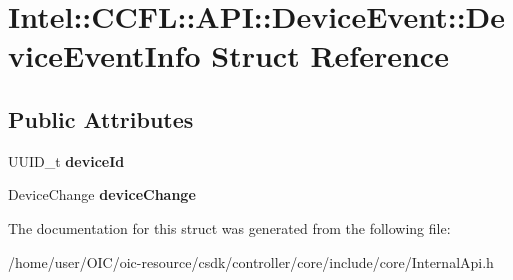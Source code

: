 \hypertarget{structIntel_1_1CCFL_1_1API_1_1DeviceEvent_1_1DeviceEventInfo}{}\section{Intel\+:\+:C\+C\+F\+L\+:\+:A\+P\+I\+:\+:Device\+Event\+:\+:Device\+Event\+Info Struct Reference}
\label{structIntel_1_1CCFL_1_1API_1_1DeviceEvent_1_1DeviceEventInfo}
\subsection*{Public Attributes}
\begin{DoxyCompactItemize}
\item 
\hypertarget{structIntel_1_1CCFL_1_1API_1_1DeviceEvent_1_1DeviceEventInfo_ab80e749741af7265481d4246534c56b8}{}U\+U\+I\+D\+\_\+t {\bfseries device\+Id}\label{structIntel_1_1CCFL_1_1API_1_1DeviceEvent_1_1DeviceEventInfo_ab80e749741af7265481d4246534c56b8}

\item 
\hypertarget{structIntel_1_1CCFL_1_1API_1_1DeviceEvent_1_1DeviceEventInfo_a751d845cbd9e0592bb9187e2f24b9630}{}Device\+Change {\bfseries device\+Change}\label{structIntel_1_1CCFL_1_1API_1_1DeviceEvent_1_1DeviceEventInfo_a751d845cbd9e0592bb9187e2f24b9630}

\end{DoxyCompactItemize}


The documentation for this struct was generated from the following file\+:\begin{DoxyCompactItemize}
\item 
/home/user/\+O\+I\+C/oic-\/resource/csdk/controller/core/include/core/Internal\+Api.\+h\end{DoxyCompactItemize}
